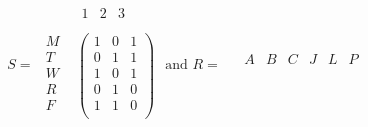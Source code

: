 \documentclass[10pt,]{book}
\theoremstyle{plain}
\theoremstyle{definition}
\theoremstyle{definition}
\theoremstyle{definition}
\theoremstyle{definition}
\begin{document}
\begin{exercisegroup}
\begin{equation*} 
S = 
\begin{array}{cc}
   & 
		\begin{array}{ccc}
		1 & 2 & 3 \\
		\end{array}
		 \\
 
	\begin{array}{c}
			 M \\
			 T \\
			 W \\
			 R \\
			 F \\
	\end{array}
     & 
     \left(
			\begin{array}{ccc}
				 1 & 0 & 1 \\
				 0 & 1 & 1 \\
				 1 & 0 & 1 \\
				 0 & 1 & 0 \\
				 1 & 1 & 0 \\
			\end{array}
		\right) \\
		\end{array}
\textrm{ and }R=
	\begin{array}{cc}
   & 
	\begin{array}{cccccc}
		 A & B & C & J & L & P \\
	\end{array}
 \\
 

\end{array}
\end{equation*}
\end{exercisegroup}
\end{document}
